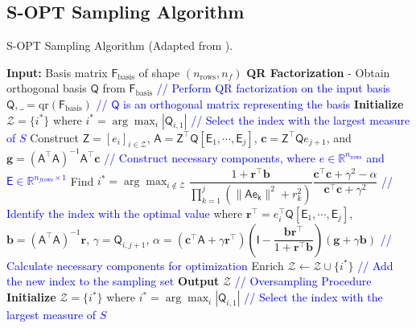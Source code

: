 \documentclass[11pt]{article}
\begin{document}
\subsection{S-OPT Sampling Algorithm}
\begin{algorithm}[H]
\caption{S-OPT Sampling Algorithm (Adapted from \cite{lauzon2024s-opt}).}
\begin{algorithmic}[1]
\STATE \textbf{Input:} Basis matrix $\mathsf{F}_{\text{basis}}$ of shape $(n_{\text{rows}}, n_f)$
\STATE \textbf{QR Factorization} - Obtain orthogonal basis $\mathsf{Q}$ from $\mathsf{F}_{\text{basis}}$ \textcolor{blue}{// Perform QR factorization on the input basis}
\STATE $\mathsf{Q}, \_ = \text{qr}(\mathsf{F}_{\text{basis}})$ \textcolor{blue}{// $\mathsf{Q}$ is an orthogonal matrix representing the basis}
\STATE \textbf{Initialize} $\mathcal{Z} = \{i^*\}$ where $i^* = \arg\max_i |\mathsf{Q}_{i,1}|$ \textcolor{blue}{// Select the index with the largest measure of $S$}
    \STATE Construct $\mathsf{Z} = [\mathit{e}_i]_{i \in \mathcal{Z}}$, $\mathsf{A} = \mathsf{Z}^\top \mathsf{Q} [\mathsf{E}_1, \cdots, \mathsf{E}_j]$, $\mathbf{c} = \mathsf{Z}^\top \mathsf{Q} \mathit{e}_{j+1}$, and $\mathbf{g} = (\mathsf{A}^\top \mathsf{A})^{-1} \mathsf{A}^\top \mathbf{c}$ \textcolor{blue}{// Construct necessary components, where $\mathit{e} \in \mathbb{R}^{n_{\text{rows}}}$ and $\mathsf{E} \in \mathbb{R}^{n_{f\text{rows}} \times 1}$}
    \STATE Find $i^* = \arg\max_{i \notin \mathcal{Z}} \dfrac{1 + \mathbf{r}^\top \mathbf{b}}{\prod_{k=1}^{j} (\|\mathsf{Ae_k}\|^2 + r_k^2)} \dfrac{\mathbf{c}^\top \mathbf{c} + \gamma^2 - \alpha}{\mathbf{c}^\top \mathbf{c} + \gamma^2}$ \textcolor{blue}{// Identify the index with the optimal value}
    \STATE where $\mathbf{r}^\top = \mathit{e}_i^\top \mathsf{Q} [\mathsf{E}_1, \cdots, \mathsf{E}_j]$, $\mathbf{b} = (\mathsf{A}^\top \mathsf{A})^{-1} \mathbf{r}$, $\gamma = \mathsf{Q}_{i,j+1}$, \newline$\alpha = (\mathbf{c}^\top \mathsf{A} + \gamma \mathbf{r}^\top) \left( \mathsf{I} - \dfrac{\mathbf{b} \mathbf{r}^\top}{1 + \mathbf{r}^\top \mathbf{b}} \right) (\mathbf{g} + \gamma \mathbf{b})$ \textcolor{blue}{// Calculate necessary components for optimization}
    \STATE Enrich $\mathcal{Z} \leftarrow \mathcal{Z} \cup \{i^*\}$ \textcolor{blue}{// Add the new index to the sampling set}
\ENDFOR
\STATE \textbf{Output} $\mathcal{Z}$
\textcolor{blue}{// Oversampling Procedure}
\STATE \textbf{Initialize} $\mathcal{Z} = \{i^*\}$ where $i^* = \arg\max_i |\mathsf{Q}_{i,1}|$ \textcolor{blue}{// Select the index with the largest measure of $S$}

\end{algorithmic}
\end{algorithm}
\end{document}
